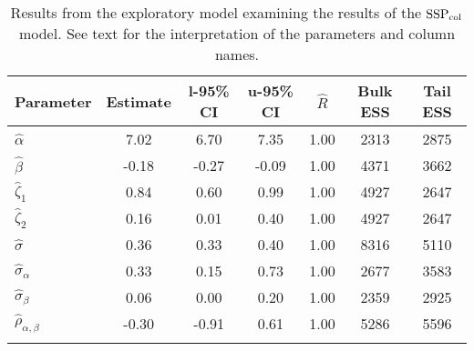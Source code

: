 \begin{table}

\caption{Results from the exploratory model examining the results of the $\operatorname{SSP}_{\text{col}}$ model. \label{tab:the exploratory-SSPobs}See text for the interpretation of the parameters and column names.}

\begin{tabular}{l *3{S[table-format=-1.2]} S[table-format=1.2] *2{S[table-format=5.0]}}
\lsptoprule
Parameter & {Estimate} & {l-95\% CI} & {u-95\% CI} & {$\hat{R}$} & {Bulk ESS} & {Tail ESS}\\
\midrule
$\hat\alpha$ & 7.02 & 6.70 & 7.35 & 1.00 & 2313 & 2875\\
$\hat\beta$ & -0.18 & -0.27 & -0.09 & 1.00 & 4371 & 3662\\
$\hat\zeta_{1}$ & 0.84 & 0.60 & 0.99 & 1.00 & 4927 & 2647\\
$\hat\zeta_{2}$ & 0.16 & 0.01 & 0.40 & 1.00 & 4927 & 2647\\
$\hat\sigma$ & 0.36 & 0.33 & 0.40 & 1.00 & 8316 & 5110\\
$\hat\sigma_{\alpha}$ & 0.33 & 0.15 & 0.73 & 1.00 & 2677 & 3583\\
$\hat\sigma_{\beta}$ & 0.06 & 0.00 & 0.20 & 1.00 & 2359 & 2925\\
$\hat\rho_{\alpha,\beta}$ & -0.30 & -0.91 & 0.61 & 1.00 & 5286 & 5596\\
\lspbottomrule
\end{tabular}

\end{table}






